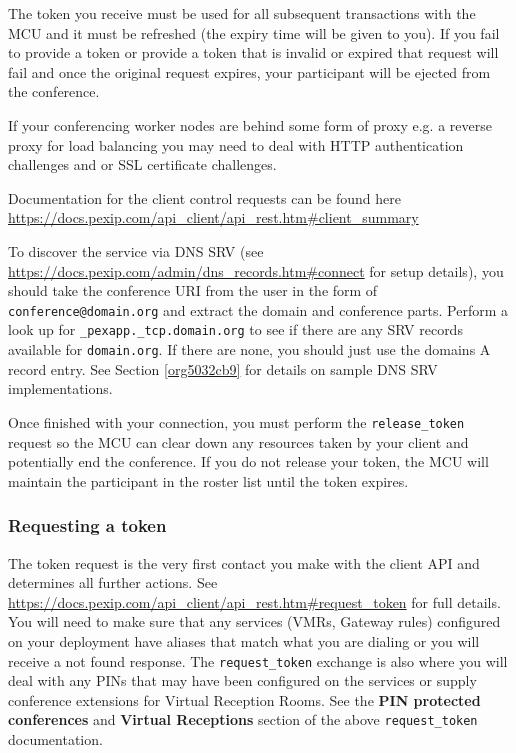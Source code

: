 \documentclass[a4paper,11pt]{article}
\begin{document}
The token you receive must be used for all subsequent transactions
with the MCU and it must be refreshed (the expiry time will be given
to you).  If you fail to provide a token or provide a token that is
invalid or expired that request will fail and once the original
request expires, your participant will be ejected from the conference.

If your conferencing worker nodes are behind some form of proxy
e.g. a reverse proxy for load balancing you may need to deal with HTTP
authentication challenges and or SSL certificate challenges.

Documentation for the client control requests can be found here
\url{https://docs.pexip.com/api\_client/api\_rest.htm\#client\_summary}

To discover the service via DNS SRV (see
\url{https://docs.pexip.com/admin/dns\_records.htm\#connect} for setup
details), you should take the conference URI from the user in the form
of \texttt{conference@domain.org} and extract the domain and conference
parts.  Perform a look up for \texttt{\_pexapp.\_tcp.domain.org} to see if
there are any SRV records available for \texttt{domain.org}.  If there are
none, you should just use the domains A record entry.  See Section
\ref{org5032cb9} for details on sample DNS SRV implementations.

Once finished with your connection, you must perform the
\texttt{release\_token} request so the MCU can clear down any resources taken
by your client and potentially end the conference.  If you do not
release your token, the MCU will maintain the participant in the
roster list until the token expires.

\subsubsection{Requesting a token}
\label{sec:org5c623a7}

\label{org82b17a1}

The token request is the very first contact you make with the client
API and determines all further actions.  See
\url{https://docs.pexip.com/api\_client/api\_rest.htm\#request\_token} for full
details.  You will need to make sure that any services (VMRs, Gateway rules)
configured on your deployment have aliases that match what you are
dialing or you will receive a not found response.  The
\texttt{request\_token} exchange is also where you will deal with any PINs
that may have been configured on the services or supply conference
extensions for Virtual Reception Rooms.  See the \textbf{PIN protected
conferences} and \textbf{Virtual Receptions} section of the above
\texttt{request\_token} documentation.
\end{document}
